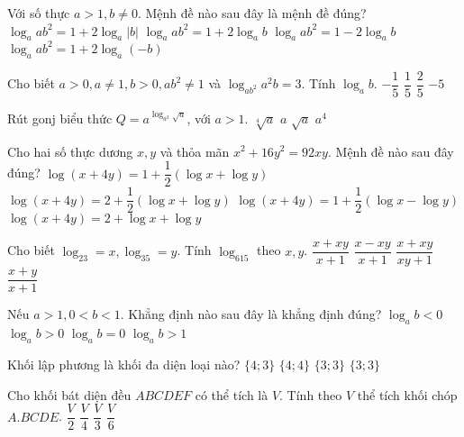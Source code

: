 \begin{ex}%
Với số thực $a>1, b \ne 0.$ Mệnh đề nào sau đây là mệnh đề đúng? 
\choice
{\True $\log_aab^2 = 1+2\log_a|b|$}
{ $\log_aab^2 = 1+2\log_ab$}
{ $\log_aab^2 = 1-2\log_ab$}
{ $\log_aab^2 = 1+2\log_a(-b)$}
\end{ex}

\begin{ex}%
Cho biết $a>0, a \ne 1, b>0, ab^2 \ne 1$ và $\log_{ab^2}a^2b = 3$. Tính $\log_ab$.
\choice
{\True $-\dfrac{1}{5}$}
{ $\dfrac{1}{5}$}
{ $\dfrac{2}{5}$}
{ $-5$}
\end{ex}


\begin{ex}%
Rút gonj biểu thức $Q=a^{\log_{a^2}\sqrt{a}}$, với $a >1$.
\choice
{\True $\sqrt[4]{a}$}
{$a$}
{$\sqrt{a}$}
{$a^4$}
\end{ex}



\begin{ex}%
 Cho hai số thực dương $x,y$ và thỏa mãn $x^2+16y^2=92xy$. Mệnh đề nào sau đây đúng?
\choice
{\True $\log(x+4y)=1+\dfrac{1}{2}(\log x+\log y)$}
{ $\log(x+4y)=2+\dfrac{1}{2}(\log x+\log y)$}
{ $\log(x+4y)=1+\dfrac{1}{2}(\log x-\log y)$}
{ $\log(x+4y)=2+\log x+\log y$}
\end{ex}

\begin{ex}%
Cho biết $\log_23=x, \log_35=y$. Tính $\log_615$ theo $x,y$.
\choice
{\True $\dfrac{x+xy}{x+1}$}
{$\dfrac{x-xy}{x+1}$}
{$\dfrac{x+xy}{xy+1}$}
{$\dfrac{x+y}{x+1}$}
\end{ex}


\begin{ex}%
Nếu $a> 1, 0<b<1$. Khẳng định nào sau đây là khẳng định đúng? 
\choice
{\True $\log_ab<0$}
{ $\log_ab>0$}
{ $\log_ab=0$}
{ $\log_ab>1$}
\end{ex}



\begin{ex}%
Khối lập phương là khối đa diện loại nào? 
\choice
{\True $\{4;3\}$}
{$\{4;4\}$}
{$\{3;3\}$}
{$\{3;3\}$}
\end{ex}

\begin{ex}%
Cho khối bát diện đều $ABCDEF$
 có thể tích là $V$. Tính theo 
$V$  thể tích khối chóp $A.BCDE$. 
\choice
{\True $\dfrac{V}{2}$}
{$\dfrac{V}{4}$}
{$\dfrac{V}{3}$}
{$\dfrac{V}{6}$}
\end{ex}


